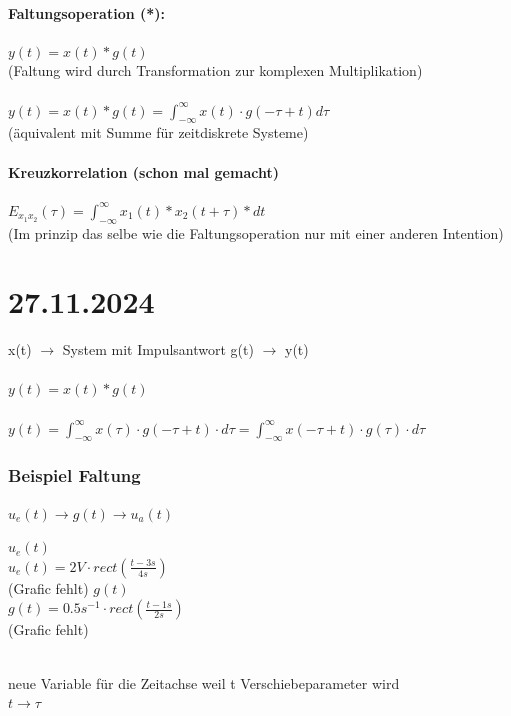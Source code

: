 \documentclass{article}
\begin{document}
\paragraph{Faltungsoperation (*):}
\begin{center}
$ y(t) = x(t) * g(t)$ \\
(Faltung wird durch Transformation zur komplexen Multiplikation) \\
\mbox{} \\
$y(t) = x(t) * g(t) = \int_{-\infty}^{\infty} x(t) \cdot g(-\tau + t) d\tau$ \\
(äquivalent mit Summe für zeitdiskrete Systeme)
\end{center}

\paragraph{Kreuzkorrelation (schon mal gemacht)}
\begin{center}
$E_{x_1x_2}(\tau) = \int_{-\infty}^{\infty} x_1(t) * x_2(t + \tau) * dt$ \\
(Im prinzip das selbe wie die Faltungsoperation nur mit einer anderen Intention)
\end{center}


\newpage
\section*{27.11.2024}
\begin{center}
	x(t) $\to$ System mit Impulsantwort g(t) $\to$ y(t) \\ \mbox{} \\
	$y(t) = x(t) * g(t)$ \\ \mbox{} \\
	$y(t) = \int_{-\infty}^{\infty} x(\tau) \cdot g(-\tau + t) \cdot d\tau = \int_{-\infty}^{\infty} x(-\tau +t) \cdot g(\tau) \cdot d\tau $ 
\end{center}
\subsubsection*{Beispiel Faltung}
$u_e(t) \to g(t) \to u_a(t)$ \\
\begin{paracol}{2}
	$u_e(t)$ \\
	$u_e(t) = 2V \cdot rect(\frac{t-3s}{4s})$ \\
	(Grafic fehlt)
	\switchcolumn
	$g(t)$ \\
	$g(t) = 0.5s^{-1} \cdot rect(\frac{t-1s}{2s})$ \\
	(Grafic fehlt)
\end{paracol}
\mbox{} \\
neue Variable für die Zeitachse weil t Verschiebeparameter wird \\
$t \to \tau$
\end{document}
